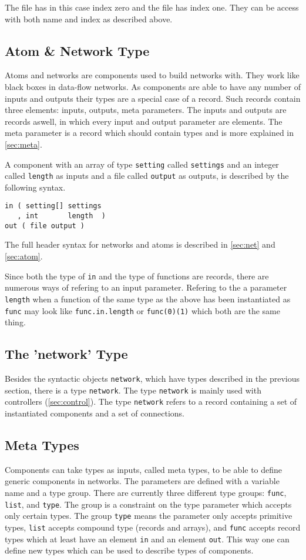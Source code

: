 The file has in this case index zero and the file has index one. They
can be access with both name and index as described above.

\subsection{Atom \& Network Type}\label{sec:atomnet}
Atoms and networks are components used to build networks with. They
work like black boxes in data-flow networks. As components are able to
have any number of inputs and outputs their types are a special case
of a record. Such records contain three elements: inputs, outputs,
meta parameters. The inputs and outputs are records aswell, in which
every input and output parameter are elements. The meta parameter is a
record which should contain types and is more explained in
\autoref{sec:meta}.

A component with an array of type \verb#setting# called
\verb#settings# and an integer called \verb#length# as inputs and a
file called \verb#output# as outputs, is described by the following
syntax.

\begin{verbatim}
in ( setting[] settings
   , int       length  )
out ( file output )
\end{verbatim}

The full header syntax for networks and atoms is described in
\autoref{sec:net} and \autoref{sec:atom}.

Since both the type of \verb#in# and the type of functions are
records, there are numerous ways of refering to an input
parameter. Refering to the a parameter \verb#length# when a function
of the same type as the above has been instantiated as \verb#func# may
look like \verb#func.in.length# or \verb#func(0)(1)# which both are
the same thing.

\subsection{The 'network' Type}
Besides the syntactic objects \verb#network#, which have types
described in the previous section, there is a type \verb#network#. The
type \verb#network# is mainly used with controllers
(\autoref{sec:control}). The type \verb#network# refers to a record
containing a set of instantiated components and a set of connections.

\subsection{Meta Types}\label{sec:meta}
Components can take types as inputs, called meta types, to be able to
define generic components in networks. The parameters are defined with
a variable name and a type group. There are currently three different
type groups: \verb#func#, \verb#list#, and \verb#type#. The group is a
constraint on the type parameter which accepts only certain types. The
group \verb#type# means the parameter only accepts primitive types,
\verb#list# accepts compound type (records and arrays), and
\verb#func# accepts record types which at least have an element
\verb#in# and an element \verb#out#. This way one can define new types
which can be used to describe types of components.

